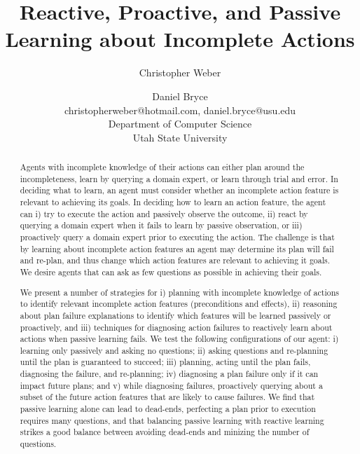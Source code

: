 \documentclass[letterpaper]{article}
\title{Reactive, Proactive, and Passive Learning about Incomplete Actions}
\author{Christopher Weber \and Daniel Bryce\\
christopherweber@hotmail.com, daniel.bryce@usu.edu\\
Department of Computer Science\\
Utah State University}
\begin{document}
\maketitle

\begin{abstract}
Agents with incomplete knowledge of their actions can either plan around the
incompleteness, learn by querying a domain expert, or learn through
trial and error.  In deciding what to learn, an agent must consider whether an
incomplete action feature is relevant to achieving its goals.  In deciding how
to learn an action feature, the agent can i) try to execute the action and
passively observe the outcome, ii) react by querying a domain expert when it
fails to learn by passive observation, or iii) proactively query a domain expert
prior to executing the action.  The challenge is that by learning about
incomplete action features an agent may determine its plan will fail and
re-plan, and thus change which action features are relevant to achieving it
goals.  We desire agents that can ask as few questions as
possible in achieving their goals.

We present a number of strategies for i) planning with incomplete knowledge of
actions to identify relevant incomplete action features (preconditions and
effects), ii) reasoning about plan failure explanations to identify which
features will be learned passively or proactively, and iii) techniques for
diagnosing action failures to reactively learn about actions when passive
learning fails.  We test the following configurations of our agent: i) learning
only passively and asking no questions; ii) asking questions and re-planning
until the plan is guaranteed to succeed; iii) planning, acting until the plan
fails, diagnosing the failure, and re-planning; iv) diagnosing a plan failure
only if it can impact future plans; and v) while diagnosing failures,
proactively querying about a subset of the future action features that are likely to cause failures. 
We find that passive learning alone can lead to dead-ends, perfecting a plan
prior to execution requires many questions, and that balancing passive learning
with reactive learning strikes a good balance between avoiding dead-ends and
minizing the number of questions.



\end{abstract}
\end{document}
